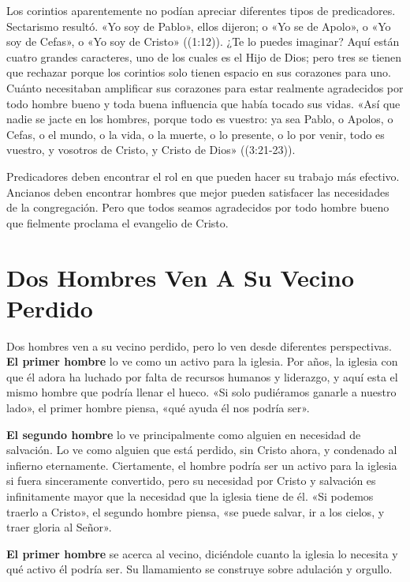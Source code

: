 \documentclass[12pt, twoside, openright]{book}
\begin{document}
Los corintios aparentemente no podían apreciar diferentes tipos de predicadores. Sectarismo resultó. «Yo soy de Pablo», ellos dijeron; o «Yo se de Apolo», o «Yo soy de Cefas», o «Yo soy de Cristo» ((1:12)). ¿Te lo puedes imaginar? Aquí están cuatro grandes caracteres, uno de los cuales es el Hijo de Dios; pero tres se tienen que rechazar porque los corintios solo tienen espacio en sus corazones para uno. Cuánto necesitaban amplificar sus corazones para estar realmente agradecidos por todo hombre bueno y toda buena influencia que había tocado sus vidas. «Así que nadie se jacte en los hombres, porque todo es vuestro: ya sea Pablo, o Apolos, o Cefas, o el mundo, o la vida, o la muerte, o lo presente, o lo por venir, todo es vuestro, y vosotros de Cristo, y Cristo de Dios» ((3:21-23)).

Predicadores deben encontrar el rol en que pueden hacer su trabajo más efectivo. Ancianos deben encontrar hombres que mejor pueden satisfacer las necesidades de la congregación. Pero que todos seamos agradecidos por todo hombre bueno que fielmente proclama el evangelio de Cristo. 

\section{Dos Hombres Ven A Su Vecino Perdido}
Dos hombres ven a su vecino perdido, pero lo ven desde diferentes perspectivas. \textbf{El primer hombre} lo ve como un activo para la iglesia. Por años, la iglesia con que él adora ha luchado por falta de recursos humanos y liderazgo, y aquí esta el mismo hombre que podría llenar el hueco. «Si solo pudiéramos ganarle a nuestro lado», el primer hombre piensa, «qué ayuda él nos podría ser».

\textbf{El segundo hombre} lo ve principalmente como alguien en necesidad de salvación. Lo ve como alguien que está perdido, sin Cristo ahora, y condenado al infierno eternamente. Ciertamente, el hombre podría ser un activo para la iglesia si fuera sinceramente convertido, pero su necesidad por Cristo y salvación es infinitamente mayor que la necesidad que la iglesia tiene de él. «Si podemos traerlo a Cristo», el segundo hombre piensa, «se puede salvar, ir a los cielos, y traer gloria al Señor».

\textbf{El primer hombre} se acerca al vecino, diciéndole cuanto la iglesia lo necesita y qué activo él podría ser. Su llamamiento se construye sobre adulación y orgullo. 
\end{document}
